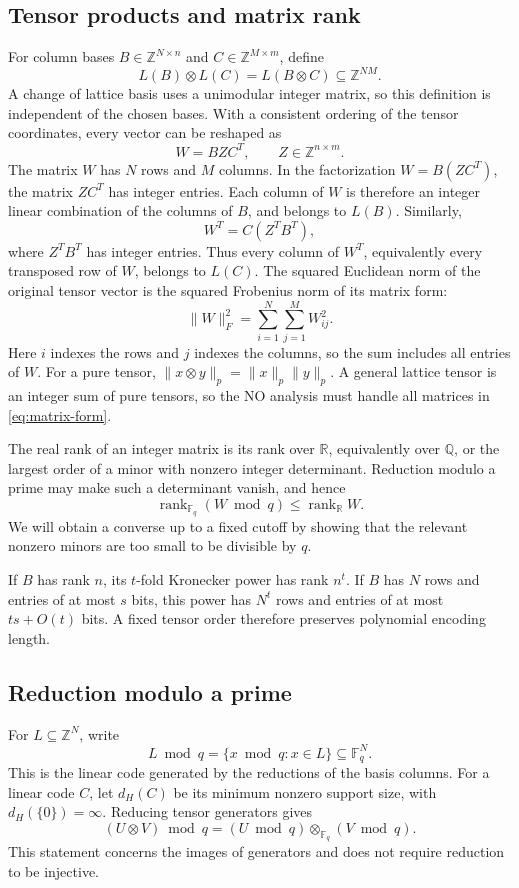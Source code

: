 \documentclass[11pt,letterpaper]{article}
\numberwithin{equation}{section}
\theoremstyle{definition}
\theoremstyle{remark}
\DeclareMathOperator{\rank}{rank}
\newcommand{\Z}{\mathbb Z}
\newcommand{\R}{\mathbb R}
\newcommand{\F}{\mathbb F}
\begin{document}
\subsection{Tensor products and matrix rank}
For column bases $B\in\Z^{N\times n}$ and $C\in\Z^{M\times m}$, define
\[
 L(B)\otimes L(C)=L(B\otimes C)\subseteq\Z^{NM}.
\]
A change of lattice basis uses a unimodular integer matrix, so this definition is independent of the chosen bases. With a consistent ordering of the tensor coordinates, every vector can be reshaped as
\begin{equation}\label{eq:matrix-form}
 W=BZC^T,\qquad Z\in\Z^{n\times m}.
\end{equation}
The matrix $W$ has $N$ rows and $M$ columns. In the factorization $W=B(ZC^T)$, the matrix $ZC^T$ has integer entries. Each column of $W$ is therefore an integer linear combination of the columns of $B$, and belongs to $L(B)$. Similarly,
\[
 W^T=C(Z^TB^T),
\]
where $Z^TB^T$ has integer entries. Thus every column of $W^T$, equivalently every transposed row of $W$, belongs to $L(C)$. The squared Euclidean norm of the original tensor vector is the squared Frobenius norm of its matrix form:
\[
 \|W\|_F^2=\sum_{i=1}^N\sum_{j=1}^M W_{ij}^2.
\]
Here $i$ indexes the rows and $j$ indexes the columns, so the sum includes all entries of $W$.
For a pure tensor, $\|x\otimes y\|_p=\|x\|_p\|y\|_p$. A general lattice tensor is an integer sum of pure tensors, so the NO analysis must handle all matrices in \eqref{eq:matrix-form}.

The real rank of an integer matrix is its rank over $\R$, equivalently over $\mathbb Q$, or the largest order of a minor with nonzero integer determinant. Reduction modulo a prime may make such a determinant vanish, and hence
\[
 \rank_{\F_q}(W\bmod q)\le\rank_{\R}W.
\]
We will obtain a converse up to a fixed cutoff by showing that the relevant nonzero minors are too small to be divisible by $q$.

If $B$ has rank $n$, its $t$-fold Kronecker power has rank $n^t$. If $B$ has $N$ rows and entries of at most $s$ bits, this power has $N^t$ rows and entries of at most $ts+O(t)$ bits. A fixed tensor order therefore preserves polynomial encoding length.

\subsection{Reduction modulo a prime}
For $L\subseteq\Z^N$, write
\[
 L\bmod q=\{x\bmod q:x\in L\}\subseteq\F_q^N.
\]
This is the linear code generated by the reductions of the basis columns. For a linear code $C$, let $d_H(C)$ be its minimum nonzero support size, with $d_H(\{0\})=\infty$. Reducing tensor generators gives
\begin{equation}\label{eq:mod-tensor}
 (U\otimes V)\bmod q=(U\bmod q)\otimes_{\F_q}(V\bmod q).
\end{equation}
This statement concerns the images of generators and does not require reduction to be injective.
\end{document}
